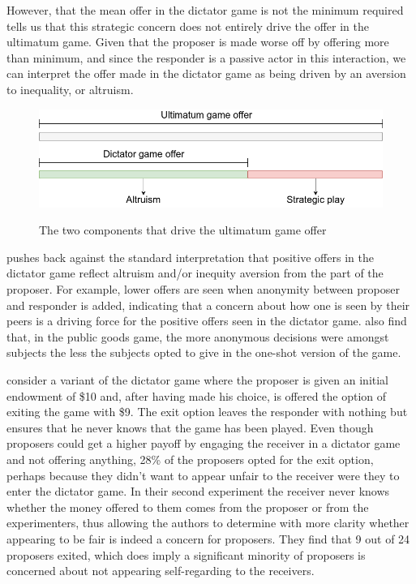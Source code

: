 \documentclass[12pt]{article}
\begin{document}
However, that the mean offer in the dictator game is not the minimum required tells us that this strategic concern does not entirely drive the offer in the ultimatum game. Given that the proposer is made worse off by offering more than minimum, and since the responder is a passive actor in this interaction, we can interpret the offer made in the dictator game as being driven by an aversion to inequality, or altruism.

\begin{figure}[H]
	\centering
	\caption{The two components that drive the ultimatum game offer}
	\includegraphics[width=1.\textwidth]{dictatoroffer.png}
	\label{fig:dictatorcomponent}
\end{figure}

\cite{list2007interpretation} pushes back against the standard interpretation that positive offers in the dictator game reflect altruism and/or inequity aversion from the part of the proposer. For example, lower offers are seen when anonymity between proposer and responder is added, indicating that a concern about how one is seen by their peers is a driving force for the positive offers seen in the dictator game. \cite{list2004young} also find that, in the public goods game, the more anonymous decisions were amongst subjects the less the subjects opted to give in the one-shot version of the game. 

\cite{dana2006you} consider a variant of the dictator game where the proposer is given an initial endowment of \$10 and, after having made his choice, is offered the option of exiting the game with \$9. The exit option leaves the responder with nothing but ensures that he never knows that the game has been played. Even though proposers could get a higher payoff by engaging the receiver in a dictator game and not offering anything, 28\% of the proposers opted for the exit option, perhaps because they didn't want to appear unfair to the receiver were they to enter the dictator game. In their second experiment the receiver never knows whether the money offered to them comes from the proposer or from the experimenters, thus allowing the authors to determine with more clarity whether appearing to be fair is indeed a concern for proposers. They find that 9 out of 24 proposers exited, which does imply a significant minority of proposers is concerned about not appearing self-regarding to the receivers.
\end{document}
